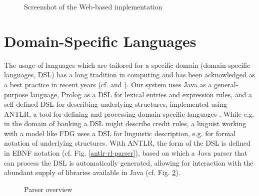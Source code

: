 \documentclass[a4paper, halfparskip, onecolumn, abstractoff, final]{scrartcl}
\begin{document}
\begin{figure}
\begin{center}
\end{center}
\caption{Screenshot of the Web-based implementation} \label{web}
\end{figure}

\section{Domain-Specific Languages}\label{dsls}

The usage of languages which are tailored for a specific domain (domain-specific languages, DSL) has a long tradition in computing and has been acknowledged as a best practice in recent years (cf. \citealt[Ch. 12]{HuntAndThomas1999} and \citealt{Parr2007}). Our system uses Java as a general-purpose language, Prolog as a DSL for lexical entries and expression rules, and a self-defined DSL for describing underlying structures, implemented using ANTLR, a tool for defining and processing domain-specific languages \citep{Parr2007}. While e.g. in the domain of banking a DSL might describe credit rules, a linguist working with a model like FDG uses a DSL for linguistic description, e.g. for formal notation of underlying structures. With ANTLR, the form of the DSL is defined in EBNF notation (cf. Fig. \ref{antlr-rl-parser}), based on which a Java parser that can process the DSL is automatically generated, allowing for interaction with the abundant supply of libraries available in Java (cf. Fig. \ref{parser-overview}).

\begin{figure}
\begin{center}
\mbox{}
\end{center}
\caption{Parser overview} \label{parser-overview}
\end{figure}



\end{document}
